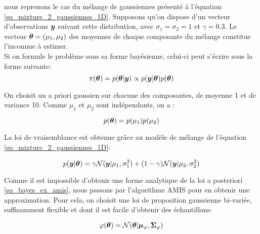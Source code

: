 nous reprenons le cas du mélange de gaussiennes présenté à l'équation \eqref{eq_mixture_2_gaussiennes_1D}. Supposons qu'on dispose d'un vecteur d'observations ${\bm{y}}$ suivant cette distribution, avec $\sigma_1 = \sigma_2 = 1$ et $\gamma = 0.3$. Le vecteur ${\bm{\theta}} = (\mu_1, \mu_2)$ des moyennes de chaque composante du mélange constitue l'inconnue à estimer.\\

Si on formule le problème sous sa forme bayésienne, celui-ci peut s'écrire sous la forme suivante:
\begin{equation}
	\pi({\bm{\theta}}) = p({\bm{\theta}} | {\bm{y}}) \propto p({\bm{y}} | {\bm{\theta}}) p({\bm{\theta}})
	\label{eq_bayes_ex_amis}
\end{equation}

On choisit un a priori gaussien sur chacune des composantes, de moyenne 1 et de variance 10. Comme $\mu_1$ et $\mu_2$ sont indépendants, on a :

\begin{equation}
	p({\bm{\theta}}) = p(\mu_1)p(\mu_2)
\end{equation}

La loi de vraisemblance est obtenue grâce au modèle de mélange de l'équation \eqref{eq_mixture_2_gaussiennes_1D}: 

\begin{equation}
	p({\bm{y}} | {\bm{\theta}}) = \gamma \mathcal{N}({\bm{y}} | \mu_1,\sigma_1^2) + (1-\gamma)\mathcal{N}({\bm{y}} | \mu_2, \sigma_2^2)
\end{equation}

Comme il est impossible d'obtenir une forme analytique de la loi a posteriori \eqref{eq_bayes_ex_amis}, nous passons par l'algorithme AMIS pour en obtenir une approximation. Pour cela, on choisit une loi de proposition gaussienne bi-variée, suffisamment flexible et dont il est facile d'obtenir des échantillons:

\begin{equation}
\varphi({\bm{\theta}}) = \mathcal{N}({\bm{\theta}} | {\bm{\mu}_\varphi}, {\bm{\Sigma}_\varphi})
\end{equation}


